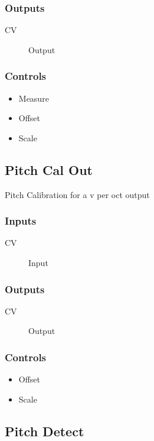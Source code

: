 \subsubsection{Outputs}
\begin{description}
\item [CV] Output
\end{description}

\subsubsection{Controls}
\begin{itemize}
\item Measure
\item Offset
\item Scale
\end{itemize}

\subsection{Pitch Cal Out}

Pitch Calibration for a v per oct output



\subsubsection{Inputs}
\begin{description}
\item [CV] Input
\end{description}

\subsubsection{Outputs}
\begin{description}
\item [CV] Output
\end{description}

\subsubsection{Controls}
\begin{itemize}
\item Offset
\item Scale
\end{itemize}

\subsection{Pitch Detect}

